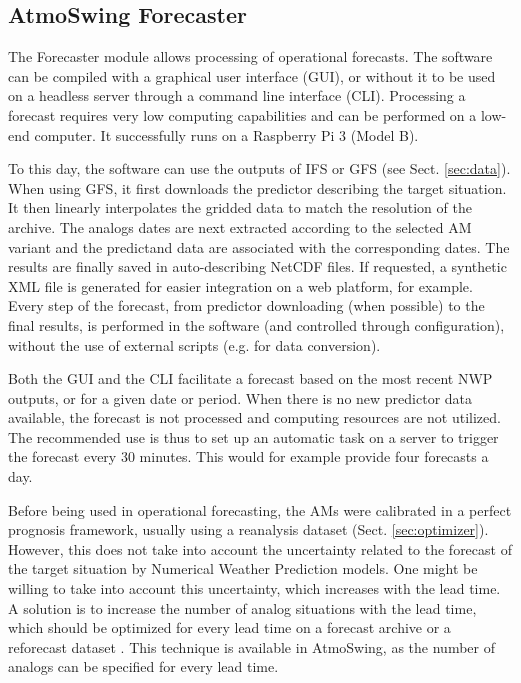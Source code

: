 \documentclass[gmdd]{copernicus}
\begin{document}
\subsection{AtmoSwing Forecaster}
\label{sec:forecaster}

The Forecaster module allows processing of operational forecasts. The software can be compiled with a graphical user interface (GUI), or without it to be used on a headless server through a command line interface (CLI). Processing a forecast requires very low computing capabilities and can be performed on a low-end computer. It successfully runs on a Raspberry Pi 3 (Model B).

To this day, the software can use the outputs of IFS or GFS (see Sect. \ref{sec:data}). When using GFS, it first downloads the predictor describing the target situation. It then linearly interpolates the gridded data to match the resolution of the archive. The analogs dates are next extracted according to the selected AM variant and the predictand data are associated with the corresponding dates. The results are finally saved in auto-describing NetCDF files. If requested, a synthetic XML file is generated for easier integration on a web platform, for example. Every step of the forecast, from predictor downloading (when possible) to the final results, is performed in the software (and controlled through configuration), without the use of external scripts (e.g. for data conversion).

Both the GUI and the CLI facilitate a forecast based on the most recent NWP outputs, or for a given date or period. When there is no new predictor data available, the forecast is not processed and computing resources are not utilized. The recommended use is thus to set up an automatic task on a server to trigger the forecast every 30 minutes. This would for example provide four forecasts a day. 

Before being used in operational forecasting, the AMs were calibrated in a perfect prognosis framework, usually using a reanalysis dataset (Sect. \ref{sec:optimizer}). However, this does not take into account the uncertainty related to the forecast of the target situation by Numerical Weather Prediction models. One might be willing to take into account this uncertainty, which increases with the lead time. A solution is to increase the number of analog situations with the lead time, which should be optimized for every lead time on a forecast archive or a reforecast dataset \citep{Thevenot2004}. This technique is available in AtmoSwing, as the number of analogs can be specified for every lead time.
\end{document}
